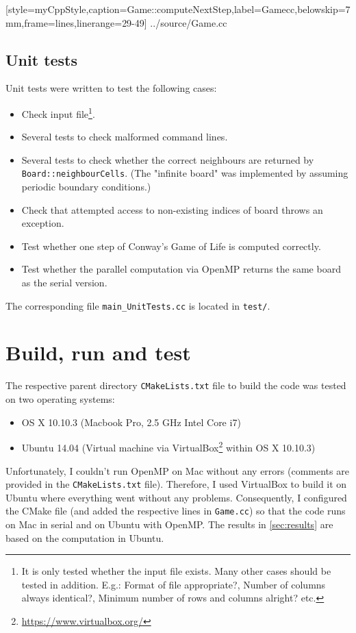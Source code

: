 
[style=myCppStyle,caption={Game::computeNextStep},label=Gamecc,belowskip=7mm,frame=lines,linerange={29-49}]
{../source/Game.cc}

\subsection{Unit tests}
Unit tests were written to test the following cases:
\begin{itemize}
	\item Check input file\footnote{It is only tested whether the input file exists. Many other cases should be tested in addition. E.g.: Format of file appropriate?, Number of columns always identical?, Minimum number of rows and columns alright? etc.}.
	\item Several tests to check malformed command lines.
	\item Several tests to check whether the correct neighbours are returned by \texttt{Board::neighbourCells}. (The "infinite board" was implemented by assuming periodic boundary conditions.)
	\item Check that attempted access to non-existing indices of board throws an exception.
	\item Test whether one step of Conway's Game of Life is computed correctly.
	\item Test whether the parallel computation via OpenMP returns the same board as the serial version.
	
\end{itemize}
The corresponding file \texttt{main\_UnitTests.cc} is located in \texttt{test/}.

\section{Build, run and test}\label{sec:BuildRunTest}
The respective parent directory \texttt{CMakeLists.txt} file to build the code was tested on two operating systems:

\begin{itemize}
	\item OS X 10.10.3 (Macbook Pro, 2.5 GHz Intel Core i7)
	\item Ubuntu 14.04 (Virtual machine via VirtualBox\footnote{\url{https://www.virtualbox.org/}} within OS X 10.10.3)
\end{itemize}

Unfortunately, I couldn't run OpenMP on Mac without any errors (comments are provided in the \texttt{CMakeLists.txt} file). Therefore, I used VirtualBox to build it on Ubuntu where everything went without any problems. Consequently, I configured the CMake file (and added the respective lines in \texttt{Game.cc}) so that the code runs on Mac in serial and on Ubuntu with OpenMP. The results in \cref{sec:results} are based on the computation in Ubuntu.


